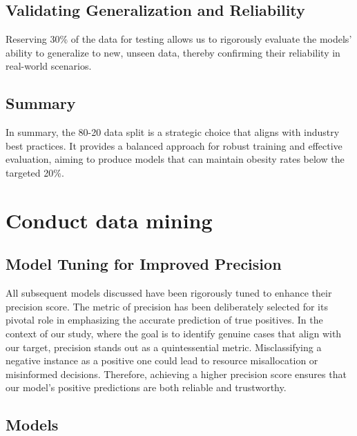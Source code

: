        \subsection{Validating Generalization and Reliability}
            Reserving 30\% of the data for testing allows us to rigorously evaluate the models' ability to generalize to new, unseen data, thereby confirming their reliability in real-world scenarios.

        \subsection{Summary}
            In summary, the 80-20 data split is a strategic choice that aligns with industry best practices. It provides a balanced approach for robust training and effective evaluation, aiming to produce models that can maintain obesity rates below the targeted 20\%.


    \section{Conduct data mining}

        \subsection{Model Tuning for Improved Precision}

            All subsequent models discussed have been rigorously tuned to enhance their precision score. The metric of precision has been deliberately selected for its pivotal role in emphasizing the accurate prediction of true positives. In the context of our study, where the goal is to identify genuine cases that align with our target, precision stands out as a quintessential metric. Misclassifying a negative instance as a positive one could lead to resource misallocation or misinformed decisions. Therefore, achieving a higher precision score ensures that our model's positive predictions are both reliable and trustworthy.

        \subsection{Models}

